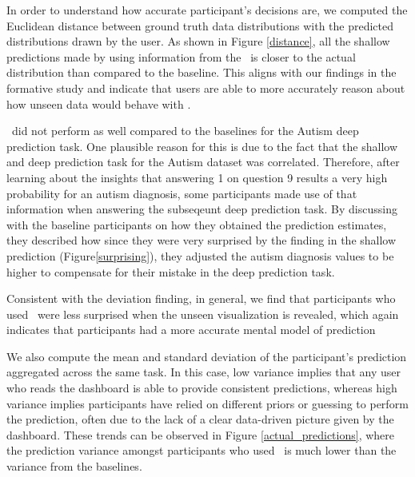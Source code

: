  In order to understand how accurate participant's decisions are, we computed the Euclidean distance between ground truth data distributions with the predicted distributions drawn by the user. As shown in Figure \ref{distance}, all the shallow predictions made by using information from the \system\ is closer to the actual distribution than compared to the baseline. This aligns with our findings in the formative study and indicate that users are able to more accurately reason about how unseen data would behave with \system.
\par \system\ did not perform as well compared to the baselines for the Autism deep prediction task. One plausible reason for this is due to the fact that the shallow and deep prediction task for the Autism dataset was correlated. Therefore, after learning about the insights that answering 1 on question 9 results a very high probability for an autism diagnosis, some participants made use of that information when answering the subseqeunt deep prediction task. By discussing with the baseline participants on how they obtained the prediction estimates, they described how since they were very surprised by the finding in the shallow prediction (Figure\ref{surprising}), they adjusted the autism diagnosis values to be higher to compensate for their mistake in the deep prediction task. 
\par Consistent with the deviation finding, in general, we find that participants who used \system\ were less surprised when the unseen visualization is revealed, which again indicates that participants had a more accurate mental model of prediction 
\par We also compute the mean and standard deviation of the participant's prediction aggregated across the same task. In this case, low variance implies that any user who reads the dashboard is able to provide consistent predictions, whereas high variance implies participants have relied on different priors or guessing to perform the prediction, often due to the lack of a clear data-driven picture given by the dashboard. These trends can be observed in Figure \ref{actual_predictions}, where the prediction variance amongst participants who used \system\ is much lower than the variance from the baselines.
